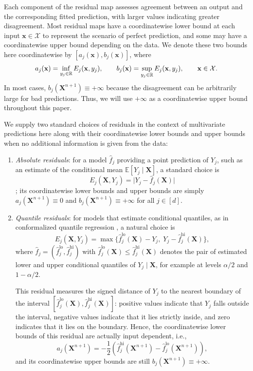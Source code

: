 Each component of the residual map assesses agreement between an output and the corresponding fitted prediction, with larger values indicating greater disagreement. Most residual maps have a coordinatewise lower bound at each input $\mathbf x\in\mathcal X$ to represent the scenario of perfect prediction, and some may have a coordinatewise upper bound depending on the data. We denote these two bounds here coordinatewise by $[a_j(\mathbf x),b_j(\mathbf x)]$, where
\[
a_j(\mathbf x)
=
\inf_{y_j\in\mathbb{R}}E_j(\mathbf x,y_j),
\qquad
b_j(\mathbf x)
=
\sup_{y_j\in\mathbb{R}}E_j(\mathbf x,y_j),
\qquad
\mathbf x\in\mathcal X.
\]
In most cases, $b_j(\mathbf X^{n+1})\equiv+\infty$ because the disagreement can be arbitrarily large for bad predictions. Thus, we will use $+\infty$ as a coordinatewise upper bound throughout this paper.

We supply two standard choices of residuals in the context of multivariate predictions here along with their coordinatewise lower bounds and upper bounds when no additional information is given from the data:
\begin{enumerate}
    \item \emph{Absolute residuals}: for a model $\hat f_j$ providing a point prediction of $Y_j$, such as an estimate of the conditional mean $\mathbb E[Y_j\mid\mathbf X]$, a standard choice is
    \[
    E_j(\mathbf X,Y_j)
    =
    \lvert Y_j-\hat f_j(\mathbf X)\rvert
    \]
    \citep{lei2018distribution}; its coordinatewise lower bounds and upper bounds are simply $a_j(\mathbf X^{n+1})\equiv0$ and $b_j(\mathbf X^{n+1})\equiv+\infty$ for all $j\in[d]$.

    \item \emph{Quantile residuals}: for models that estimate conditional quantiles, as in conformalized quantile regression \citep{romano2019conformalized}, a natural choice is
    \[
    E_j(\mathbf X,Y_j)
    =
    \max\bigl\{
    \hat f_j^{\mathrm{lo}}(\mathbf X)-Y_j,\;
    Y_j-\hat f_j^{\mathrm{hi}}(\mathbf X)
    \bigr\},
    \]
    where $\hat f_j=(\hat f_j^{\mathrm{lo}},\hat f_j^{\mathrm{hi}})$ with $\hat f_j^{\mathrm{lo}}(\mathbf X)\leq\hat f_j^{\mathrm{hi}}(\mathbf X)$ denotes the pair of estimated lower and upper conditional quantiles of $Y_j\mid\mathbf X$, for example at levels $\alpha/2$ and $1-\alpha/2$.

    This residual measures the signed distance of $Y_j$ to the nearest boundary of the interval $[\hat f_j^{\mathrm{lo}}(\mathbf X),\hat f_j^{\mathrm{hi}}(\mathbf X)]$: positive values indicate that $Y_j$ falls outside the interval, negative values indicate that it lies strictly inside, and zero indicates that it lies on the boundary. Hence, the coordinatewise lower bounds of this residual are actually input dependent, i.e.,
    \[
    a_j(\mathbf X^{n+1})
    =
    -\frac12\left(
    \hat f_j^{\mathrm{hi}}(\mathbf X^{n+1})
    -
    \hat f_j^{\mathrm{lo}}(\mathbf X^{n+1})
    \right),
    \]
    and its coordinatewise upper bounds are still $b_j(\mathbf X^{n+1})\equiv+\infty$.
\end{enumerate}

